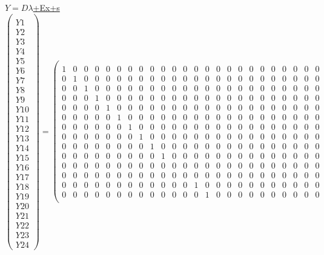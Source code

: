 \documentclass[10pt]{article}
\begin{document}
\small
\underline{$Y=D\lambda$+Ex+s}
\[\left(\begin{array}{c}
  \\Y1\\Y2\\Y3\\Y4\\Y5\\Y6\\Y7\\Y8\\Y9\\Y10\\Y11\\Y12\\Y13\\Y14\\Y15\\Y16\\Y17\\Y18\\Y19\\Y20\\Y21\\Y22\\Y23\\Y24
 \end{array}\right)=
\left(\begin{array}{cccccccccccccccccccccccc}
  \\
  \hline
1&0&0&0&0&0&0&0&0&0&0&0&0&0&0&0&0&0&0&0&0&0&0&0\\
0&1&0&0&0&0&0&0&0&0&0&0&0&0&0&0&0&0&0&0&0&0&0&0\\
0&0&1&0&0&0&0&0&0&0&0&0&0&0&0&0&0&0&0&0&0&0&0&0\\
0&0&0&1&0&0&0&0&0&0&0&0&0&0&0&0&0&0&0&0&0&0&0&0\\
0&0&0&0&1&0&0&0&0&0&0&0&0&0&0&0&0&0&0&0&0&0&0&0\\
0&0&0&0&0&1&0&0&0&0&0&0&0&0&0&0&0&0&0&0&0&0&0&0\\
0&0&0&0&0&0&1&0&0&0&0&0&0&0&0&0&0&0&0&0&0&0&0&0\\
0&0&0&0&0&0&0&1&0&0&0&0&0&0&0&0&0&0&0&0&0&0&0&0\\
0&0&0&0&0&0&0&0&1&0&0&0&0&0&0&0&0&0&0&0&0&0&0&0\\
0&0&0&0&0&0&0&0&0&1&0&0&0&0&0&0&0&0&0&0&0&0&0&0\\
0&0&0&0&0&0&0&0&0&0&0&0&0&0&0&0&0&0&0&0&0&0&0&0\\
0&0&0&0&0&0&0&0&0&0&0&0&0&0&0&0&0&0&0&0&0&0&0&0\\
0&0&0&0&0&0&0&0&0&0&0&0&1&0&0&0&0&0&0&0&0&0&0&0\\
0&0&0&0&0&0&0&0&0&0&0&0&0&1&0&0&0&0&0&0&0&0&0&0\\

\end{array}\]
\end{document}
